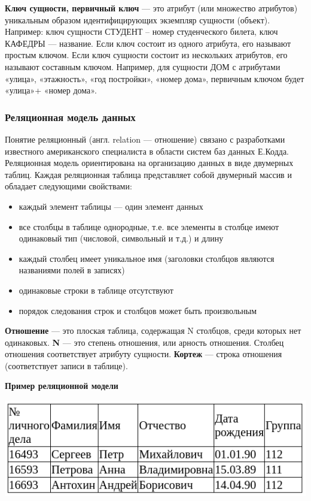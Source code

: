 \documentclass[a4paper]{article}
\begin{document}
\textbf{Ключ сущности, первичный ключ} --- это атрибут (или множество атрибутов) уникальным образом идентифицирующих экземпляр сущности (объект). Например: ключ сущности СТУДЕНТ – номер студенческого билета, ключ КАФЕДРЫ --- название. Если ключ состоит из одного атрибута, его называют простым ключом. Если ключ сущности состоит из нескольких атрибутов, его называют составным ключом. Например, для сущности ДОМ с атрибутами «улица», «этажность», «год постройки», «номер дома», первичным ключом будет «улица»+ «номер дома».

\subsubsection{Реляционная модель данных}

Понятие реляционный (англ. relation --- отношение) связано с разработками известного американского специалиста в области систем баз данных Е.Кодда. Реляционная модель ориентирована на организацию данных в виде двумерных таблиц. Каждая реляционная таблица представляет собой двумерный массив и обладает следующими свойствами:

\begin{itemize}
    \item каждый элемент таблицы --- один элемент данных
    \item все столбцы в таблице однородные, т.е. все элементы в столбце имеют одинаковый тип (числовой, символьный и т.д.) и длину
    \item каждый столбец имеет уникальное имя (заголовки столбцов являются названиями полей в записях)
    \item одинаковые строки в таблице отсутствуют
  \item порядок следования строк и столбцов может быть произвольным
\end{itemize}

\textbf{Отношение} --- это плоская таблица, содержащая N столбцов, среди которых нет одинаковых. \textbf{N} --- это степень отношения, или арность отношения. Столбец отношения соответствует атрибуту сущности. \textbf{Кортеж} --- строка отношения (соответствует записи в таблице).

\textbf{Пример реляционной модели}

\includegraphics[width=\textwidth]{db1.png}
\end{document}
